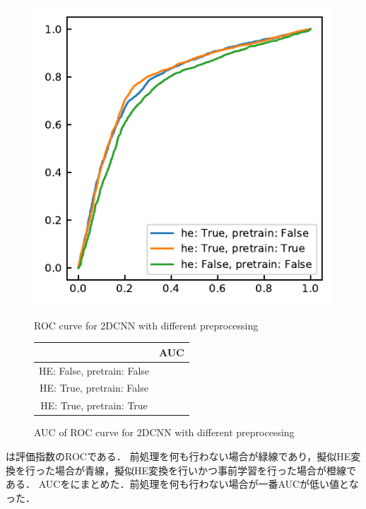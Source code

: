 \begin{figure}[H]
	\centering
	\begin{minipage}{0.5\columnwidth}
		\centering
		\includegraphics[width=\linewidth]{fig/chapter4/2dcnn_preprocessing}
		\caption{ROC curve for 2DCNN with different preprocessing}
		\label{fig:2dcnnpreprocessing}
	\end{minipage}
	\makeatletter
	\def\@captype{table}
	\makeatother
	\begin{minipage}{0.4\columnwidth}
		\centering
		\caption{AUC of ROC curve for 2DCNN with different preprocessing}
		\label{tab:2DCNNpreprocessing_AUC}
		\begin{tabular}{cc}\toprule
			& AUC \\ \midrule
			HE: False, pretrain: False &  \\ 
			HE: True, pretrain: False &  \\ 
			HE: True, pretrain: True &  \\ \bottomrule
		\end{tabular} 
	\end{minipage}
\end{figure}

は評価指数のROCである．  
前処理を何も行わない場合が緑線であり，擬似HE変換を行った場合が青線，擬似HE変換を行いかつ事前学習を行った場合が橙線である．
AUCをにまとめた．前処理を何も行わない場合が一番AUCが低い値となった．

